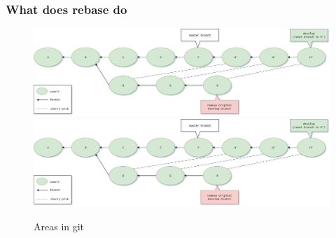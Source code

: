 \begin{frame}[fragile]
    \frametitle{What does rebase do}
    \begin{figure}
        \begin{center}
            {
                \includegraphics[width=1\textwidth,keepaspectratio]{./images/Rebase-Completed.png}
            }
            {
                \includegraphics[width=1\textwidth,keepaspectratio]{./images/Rebase-Completed.png}
            }
            \caption{Areas in git}
        \end{center}
    \end{figure}
\end{frame}

